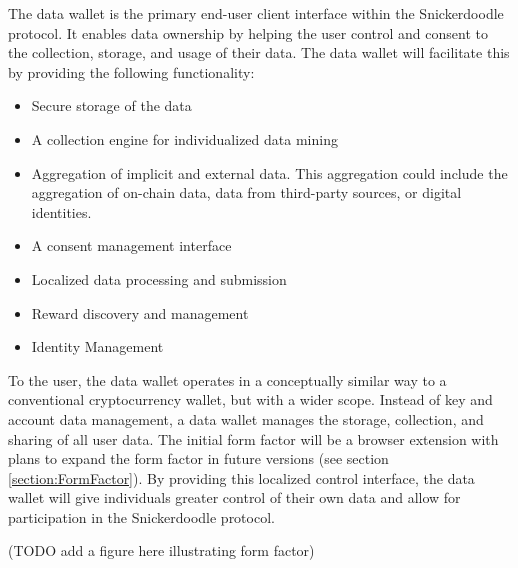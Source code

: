 The data wallet is the primary end-user client interface within the Snickerdoodle protocol. It enables data ownership by helping the user control and consent to the collection, storage, and usage of their data. The data wallet will facilitate this by providing the following functionality:
\begin{itemize}
  \item Secure storage of the data
  \item A collection engine for individualized data mining
  \item Aggregation of implicit and external data. This aggregation could include the aggregation of on-chain data, data from third-party sources, or digital identities.
  \item A consent management interface
  \item Localized data processing and submission
  \item Reward discovery and management
  \item Identity Management
\end{itemize}






To the user, the data wallet operates in a conceptually similar way to a conventional cryptocurrency wallet, but with a wider scope. Instead of key and account data management, a data wallet manages the storage, collection, and sharing of all user data. The initial form factor will be a browser extension with plans to expand the form factor in future versions (see section \ref{section:FormFactor}). By providing this localized control interface, the data wallet will give individuals greater control of their own data and allow for participation in the Snickerdoodle protocol.

(TODO add a figure here illustrating form factor)


